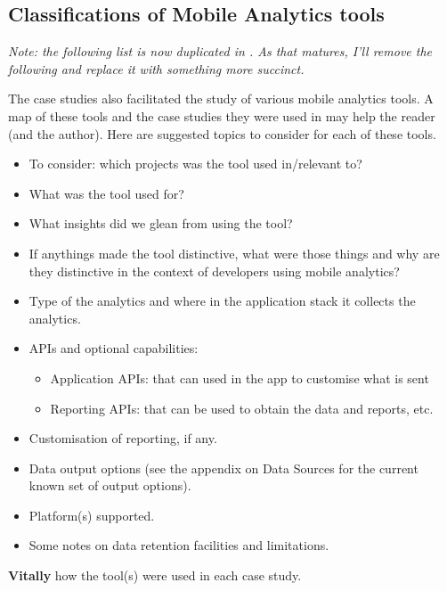 \begin{comment}
MUST-DO
Disambiguate Contributions into Evidence, Insights, and the Distinct Opportunity/Perspectives it provided. Impact on the teams.
Consider an Insights table, mapping back on to the case studies. 
Insights in practices of the development teams. 
Try creating an evidence table. 
\end{comment}

\subsection{Classifications of Mobile Analytics tools}
\textit{Note: the following list is now duplicated in \href{classifications-of-mobile-analytics-tools-used-in-this-research}{}. As that matures, I'll remove the following and replace it with something more succinct.}

The case studies also facilitated the study of various mobile analytics tools. A map of these tools and the case studies they were used in may help the reader (and the author). Here are suggested topics to consider for each of these tools.
\begin{itemize}
    \itemsep0em
    \item To consider: which projects was the tool used in/relevant to?
    \item What was the tool used for?
    \item What insights did we glean from using the tool?
    \item If anythings made the tool distinctive, what were those things and why are they distinctive in the context of developers using mobile analytics?
    \item Type of the analytics and where in the application stack it collects the analytics.
    \item APIs and optional capabilities:
    \begin{itemize}
        \item Application APIs: that can used in the app to customise what is sent
        \item Reporting APIs: that can be used to obtain the data and reports, etc. 
    \end{itemize}
    \item Customisation of reporting, if any.
    \item Data output options (see the appendix on Data Sources for the current known set of output options).
    \item Platform(s) supported.
    \item Some notes on data retention facilities and limitations.
\end{itemize}
\textbf{Vitally} how the tool(s) were used in each case study.



